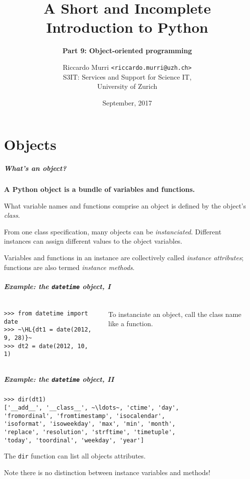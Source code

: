 \documentclass[english,serif,mathserif,xcolor=pdftex,dvipsnames,table]{beamer}
\title[9. Object-orientation]{%
  A Short and Incomplete Introduction to Python
}
\subtitle{\bfseries Part 9: Object-oriented programming}
\author[R.~Murri]{%
  Riccardo Murri \texttt{<riccardo.murri@uzh.ch>}
  \\
  S3IT: Services and Support for Science IT,
  \\
  University of Zurich
}
\date{September, 2017}
\begin{document}
\maketitle


\part{Objects}

\begin{frame}
  \frametitle{What's an \emph{object}?}
  \textbf{A Python object is a bundle of variables and functions.}

  \+
  What variable names and functions comprise an object is defined
  by the object's \emph{class}.

  \+
  From one class specification, many objects can be
  \emph{instanciated}.  Different instances can assign different
  values to the object variables.

  \+
  Variables and functions in an instance are collectively called
  \emph{instance attributes}; functions are also termed \emph{instance
    methods}.
\end{frame}


\begin{frame}[fragile]
  \frametitle{Example: the \texttt{datetime} object, I}
  \begin{columns}[c]
    \begin{column}{0.5\textwidth}
\begin{lstlisting}
>>> from datetime import date
>>> ~\HL{dt1 = date(2012, 9, 28)}~
>>> dt2 = date(2012, 10, 1)
\end{lstlisting}
    \end{column}
    \begin{column}{0.5\textwidth}
      \raggedleft
      To instanciate an object, call the class name like a
      function.
    \end{column}
  \end{columns}
\end{frame}


\begin{frame}[fragile]
  \frametitle{Example: the \texttt{datetime} object, II}
\begin{lstlisting}
>>> dir(dt1)
['__add__', '__class__', ~\ldots~, 'ctime', 'day',
'fromordinal', 'fromtimestamp', 'isocalendar',
'isoformat', 'isoweekday', 'max', 'min', 'month',
'replace', 'resolution', 'strftime', 'timetuple',
'today', 'toordinal', 'weekday', 'year']
\end{lstlisting}

  \+
  The \texttt{dir} function can list all objects attributes.

  \+
  Note there is no distinction between instance variables and
  methods!
\end{frame}
\end{document}

